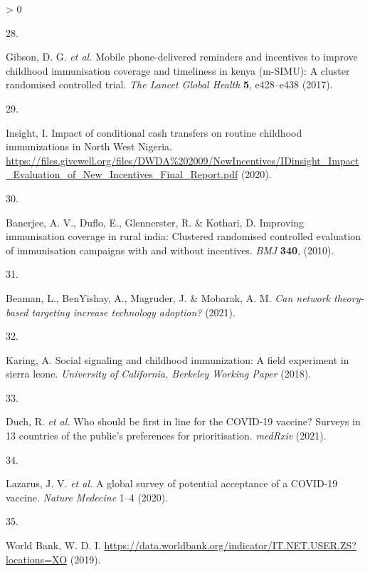 \documentclass[
  12pt,
]{article}
\newlength{\cslhangindent}
\newlength{\csllabelwidth}
\newenvironment{CSLReferences}[2] %
 {%
  \setlength{\parindent}{0pt}
  \ifodd #1 \everypar{\setlength{\hangindent}{\cslhangindent}}\ignorespaces\fi
  \ifnum #2 > 0
  \setlength{\parskip}{#2\baselineskip}
  \fi
 }%
 {}
\newcommand{\CSLLeftMargin}[1]{\parbox[t]{\csllabelwidth}{#1}}
\newcommand{\CSLRightInline}[1]{\parbox[t]{\linewidth - \csllabelwidth}{#1}\break}
\begin{document}
\begin{CSLReferences}{0}{0}
\leavevmode\hypertarget{ref-gibsonetal2017}{}%
\CSLLeftMargin{28. }
\CSLRightInline{Gibson, D. G. \emph{et al.} Mobile phone-delivered reminders and incentives to improve childhood immunisation coverage and timeliness in kenya (m-SIMU): A cluster randomised controlled trial. \emph{The Lancet Global Health} \textbf{5}, e428--e438 (2017).}

\leavevmode\hypertarget{ref-idinsight}{}%
\CSLLeftMargin{29. }
\CSLRightInline{Insight, I. {Impact of conditional cash transfers on routine childhood immunizations in North West Nigeria}. \url{https://files.givewell.org/files/DWDA\%202009/NewIncentives/IDinsight_Impact_Evaluation_of_New_Incentives_Final_Report.pdf} (2020).}

\leavevmode\hypertarget{ref-Banerjee2010}{}%
\CSLLeftMargin{30. }
\CSLRightInline{Banerjee, A. V., Duflo, E., Glennerster, R. \& Kothari, D. Improving immunisation coverage in rural india: Clustered randomised controlled evaluation of immunisation campaigns with and without incentives. \emph{BMJ} \textbf{340}, (2010).}

\leavevmode\hypertarget{ref-beaman2021can}{}%
\CSLLeftMargin{31. }
\CSLRightInline{Beaman, L., BenYishay, A., Magruder, J. \& Mobarak, A. M. \emph{Can network theory-based targeting increase technology adoption?} (2021).}

\leavevmode\hypertarget{ref-karing2018social}{}%
\CSLLeftMargin{32. }
\CSLRightInline{Karing, A. Social signaling and childhood immunization: A field experiment in sierra leone. \emph{University of California, Berkeley Working Paper} (2018).}

\leavevmode\hypertarget{ref-Duch2021}{}%
\CSLLeftMargin{33. }
\CSLRightInline{Duch, R. \emph{et al.} Who should be first in line for the COVID-19 vaccine? Surveys in 13 countries of the public{'}s preferences for prioritisation. \emph{medRxiv} (2021).}

\leavevmode\hypertarget{ref-lazarus2020nature}{}%
\CSLLeftMargin{34. }
\CSLRightInline{Lazarus, J. V. \emph{et al.} A global survey of potential acceptance of a COVID-19 vaccine. \emph{Nature Medecine} 1--4 (2020).}

\leavevmode\hypertarget{ref-wbinternet}{}%
\CSLLeftMargin{35. }
\CSLRightInline{World Bank, W. D. I. \url{https://data.worldbank.org/indicator/IT.NET.USER.ZS?locations=XO} (2019).}

\end{CSLReferences}

\newpage
\end{document}
